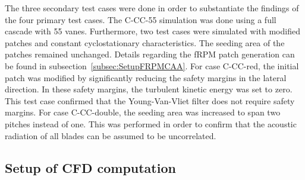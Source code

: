 The three secondary test cases were done in order to substantiate the findings of the four primary test cases.  The C-CC-55 simulation was done using a full cascade with 55 vanes.  Furthermore, two test cases were simulated with modified patches and constant cyclostationary characteristics.  The seeding area of the patches remained unchanged.  Details regarding the fRPM patch generation can be found in subsection~\ref{subsec:SetupFRPMCAA}.
For case C-CC-red, the initial patch was modified by significantly reducing the safety margins in the lateral direction.  In these safety margins, the turbulent kinetic energy was set to zero.  This test case confirmed that the Young-Van-Vliet filter does not require safety margins. For case C-CC-double, the seeding area was increased to span two pitches instead of one. This was performed in order to confirm that the acoustic radiation of all blades can be assumed to be uncorrelated.






\subsection{Setup of CFD computation}

